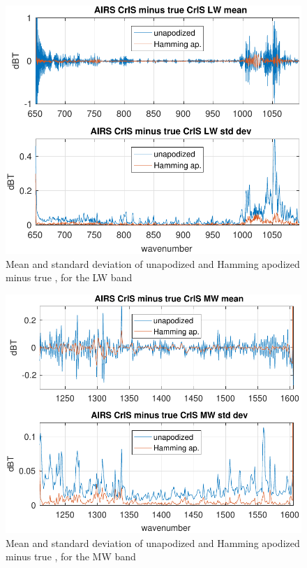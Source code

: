 \documentclass[10pt,twocolumn]{article}  %
\begin{document}
\begin{figure} %
  \centering
  \includegraphics[width=\linewidth]{figures/a2cris_diff_LW.pdf}
  \caption{Mean and standard deviation of unapodized and Hamming
    apodized {\airs} {\cris} minus true {\cris}, for the {\cris} LW
    band}
  \label{diffLW}
\end{figure}

\begin{figure} %
  \centering
  \includegraphics[width=\linewidth]{figures/a2cris_diff_MW.pdf}
  \caption{Mean and standard deviation of unapodized and Hamming
    apodized {\airs} {\cris} minus true {\cris}, for the {\cris} MW
    band}
  \label{diffMW}
\end{figure}
\end{document}
